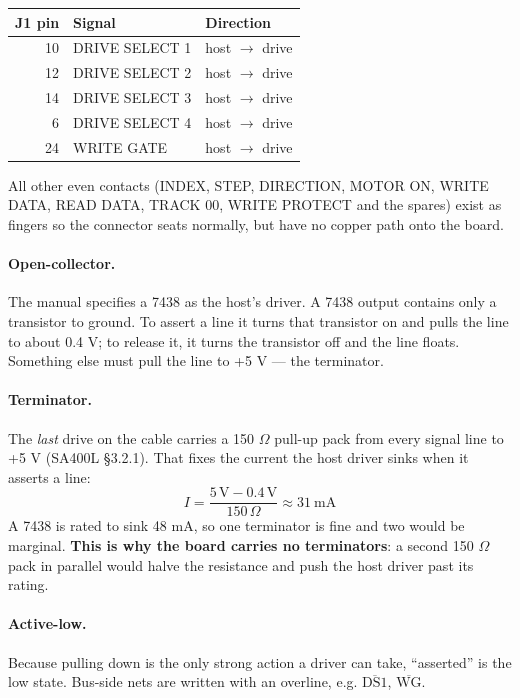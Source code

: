 \documentclass[11pt,a4paper]{article}
\newcommand{\nb}[1]{\overline{\mathrm{#1}}}      %
\begin{document}
\begin{center}
\begin{tabular}{@{}rll@{}}
\toprule
J1 pin & Signal & Direction\\
\midrule
10 & DRIVE SELECT 1 & host $\to$ drive\\
12 & DRIVE SELECT 2 & host $\to$ drive\\
14 & DRIVE SELECT 3 & host $\to$ drive\\
6 & DRIVE SELECT 4 & host $\to$ drive\\
24 & WRITE GATE & host $\to$ drive\\
\bottomrule
\end{tabular}
\end{center}

All other even contacts (INDEX, STEP, DIRECTION, MOTOR ON, WRITE DATA, READ DATA, TRACK 00, WRITE PROTECT
and the spares) exist as fingers so the connector seats normally, but have no copper path onto the board.

\paragraph{Open-collector.}
The manual specifies a 7438 as the host's driver. A 7438 output contains only a transistor to ground. To
assert a line it turns that transistor on and pulls the line to about 0.4 V; to release it, it turns the
transistor off and the line floats. Something else must pull the line to +5 V --- the terminator.

\paragraph{Terminator.}
The \emph{last} drive on the cable carries a 150 $\Omega$ pull-up pack from every signal line to +5 V
(SA400L \S3.2.1). That fixes the current the host driver sinks when it asserts a line:
\[
I = \frac{5\,\mathrm{V} - 0.4\,\mathrm{V}}{150\,\Omega} \approx 31\ \mathrm{mA}
\]
A 7438 is rated to sink 48 mA, so one terminator is fine and two would be marginal. \textbf{This is why the
board carries no terminators}: a second 150 $\Omega$ pack in parallel would halve the resistance and push
the host driver past its rating.

\paragraph{Active-low.}
Because pulling down is the only strong action a driver can take, ``asserted'' is the low state.
Bus-side nets are written with an overline, e.g. $\nb{DS1}$, $\nb{WG}$.
\end{document}
